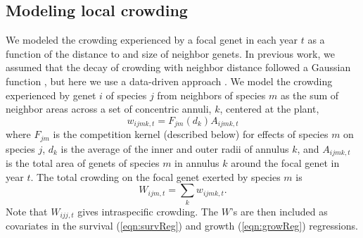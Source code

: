 \documentclass[11pt]{article}
\begin{document}
\subsection{Modeling local crowding}
We modeled the crowding experienced by a focal genet in each year $t$ as a function of the distance to and size of neighbor genets. In previous work, 
we assumed that the decay of crowding with neighbor distance followed a Gaussian function \citep{chu_large_2015}, but here we use a data-driven 
approach \citep{teller_linking_2016}. We model the crowding experienced by genet $i$ of species $j$ from neighbors of species $m$ as the sum of neighbor 
areas across a set of concentric annuli, $k$, centered at the plant,
\begin{equation}
w_{ijmk,t} = F_{jm}(d_{k})A_{ijmk,t}     
\label{eqn:wik}
\end{equation}
where $F_{jm}$ is the competition kernel (described below) for effects of species $m$ on species $j$, 
$d_{k}$ is the average of the inner and outer radii of annulus $k$, 
and $A_{ijmk,t}$ is the total area of genets of species $m$ in annulus $k$ around the focal genet in year $t$. The total crowding on 
the focal genet exerted by species $m$ is
\begin{equation}
W_{ijm,t}  =\sum_k {w_{ijmk,t}} .
\label{eqn:wijm}
\end{equation} 
Note that $W_{ijj,t}$ gives intraspecific crowding. The $W$'s are then 
included as covariates in the survival (\ref{eqn:survReg}) and growth (\ref{eqn:growReg}) regressions.
\end{document}
